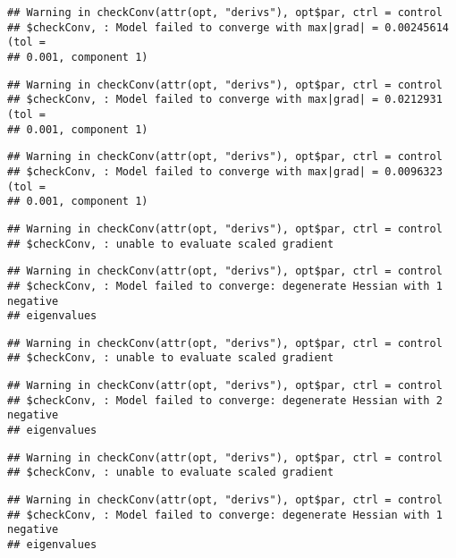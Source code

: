 \documentclass[]{article}
\begin{document}
\begin{verbatim}
## Warning in checkConv(attr(opt, "derivs"), opt$par, ctrl = control
## $checkConv, : Model failed to converge with max|grad| = 0.00245614 (tol =
## 0.001, component 1)
\end{verbatim}

\begin{verbatim}
## Warning in checkConv(attr(opt, "derivs"), opt$par, ctrl = control
## $checkConv, : Model failed to converge with max|grad| = 0.0212931 (tol =
## 0.001, component 1)
\end{verbatim}

\begin{verbatim}
## Warning in checkConv(attr(opt, "derivs"), opt$par, ctrl = control
## $checkConv, : Model failed to converge with max|grad| = 0.0096323 (tol =
## 0.001, component 1)
\end{verbatim}

\begin{verbatim}
## Warning in checkConv(attr(opt, "derivs"), opt$par, ctrl = control
## $checkConv, : unable to evaluate scaled gradient
\end{verbatim}

\begin{verbatim}
## Warning in checkConv(attr(opt, "derivs"), opt$par, ctrl = control
## $checkConv, : Model failed to converge: degenerate Hessian with 1 negative
## eigenvalues
\end{verbatim}

\begin{verbatim}
## Warning in checkConv(attr(opt, "derivs"), opt$par, ctrl = control
## $checkConv, : unable to evaluate scaled gradient
\end{verbatim}

\begin{verbatim}
## Warning in checkConv(attr(opt, "derivs"), opt$par, ctrl = control
## $checkConv, : Model failed to converge: degenerate Hessian with 2 negative
## eigenvalues
\end{verbatim}

\begin{verbatim}
## Warning in checkConv(attr(opt, "derivs"), opt$par, ctrl = control
## $checkConv, : unable to evaluate scaled gradient
\end{verbatim}

\begin{verbatim}
## Warning in checkConv(attr(opt, "derivs"), opt$par, ctrl = control
## $checkConv, : Model failed to converge: degenerate Hessian with 1 negative
## eigenvalues
\end{verbatim}
\end{document}

